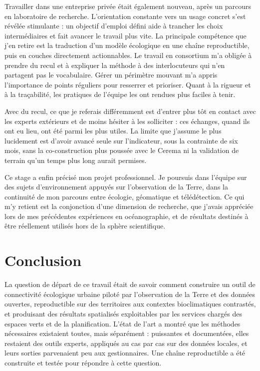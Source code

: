 \documentclass[a4paper,12pt]{report}
\begin{document}
Travailler dans une entreprise privée était également nouveau, après un parcours en laboratoire de recherche. L'orientation constante vers un usage concret s'est révélée stimulante : un objectif d'emploi défini aide à trancher les choix intermédiaires et fait avancer le travail plus vite. La principale compétence que j'en retire est la traduction d'un modèle écologique en une chaîne reproductible, puis en couches directement actionnables. Le travail en consortium m'a obligée à prendre du recul et à expliquer la méthode à des interlocuteurs qui n'en partagent pas le vocabulaire. Gérer un périmètre mouvant m'a appris l'importance de points réguliers pour resserrer et prioriser. Quant à la rigueur et à la traçabilité, les pratiques de l'équipe les ont rendues plus faciles à tenir.

Avec du recul, ce que je referais différemment est d'entrer plus tôt en contact avec les experts extérieurs et de moins hésiter à les solliciter : ces échanges, quand ils ont eu lieu, ont été parmi les plus utiles. La limite que j'assume le plus lucidement est d'avoir avancé seule sur l'indicateur, sous la contrainte de six mois, sans la co-construction plus poussée avec le Cerema ni la validation de terrain qu'un temps plus long aurait permises.

Ce stage a enfin précisé mon projet professionnel. Je poursuis dans l'équipe sur des sujets d'environnement appuyés sur l'observation de la Terre, dans la continuité de mon parcours entre écologie, géomatique et télédétection. Ce qui m'y retient est la conjonction d'une dimension de recherche, que j'avais appréciée lors de mes précédentes expériences en océanographie, et de résultats destinés à être réellement utilisés hors de la sphère scientifique.

\chapter{Conclusion}
La question de départ de ce travail était de savoir comment construire un outil de connectivité écologique urbaine piloté par l'observation de la Terre et des données ouvertes, reproductible sur des territoires aux contextes bioclimatiques contrastés, et produisant des résultats spatialisés exploitables par les services chargés des espaces verts et de la planification. L'état de l'art a montré que les méthodes nécessaires existaient toutes, mais séparément : puissantes et documentées, elles restaient des outils experts, appliqués au cas par cas sur des données locales, et leurs sorties parvenaient peu aux gestionnaires. Une chaîne reproductible a été construite et testée pour répondre à cette question.
\end{document}
